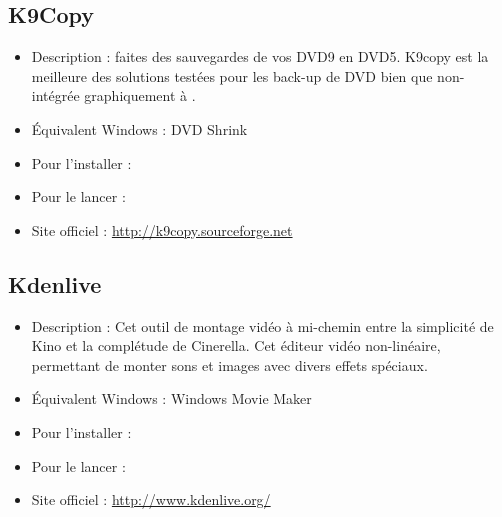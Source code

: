 \subsection{K9Copy}
\begin{itemize}
\begingroup
{}
\item Description : faites des sauvegardes de vos DVD9 en DVD5. K9copy est la meilleure des solutions testées pour les back-up de DVD bien que non-intégrée graphiquement à .{\par}
\item Équivalent Windows : DVD Shrink{\par}
\item Pour l'installer : 
\item Pour le lancer : 
\item Site officiel : \url{http://k9copy.sourceforge.net}{\par}
\endgroup
\end{itemize}
\subsection{Kdenlive}
\begin{itemize}
\begingroup
{}
\item Description : Cet outil de montage vidéo à mi-chemin entre la simplicité de Kino et la complétude de Cinerella. Cet éditeur vidéo non-linéaire, permettant de monter sons et images avec divers effets spéciaux.{\par}
\endgroup
\item Équivalent Windows : Windows Movie Maker{\par}
\item Pour l'installer : 
\item Pour le lancer : 
\item Site officiel : \url{http://www.kdenlive.org/}{\par}
\end{itemize}
